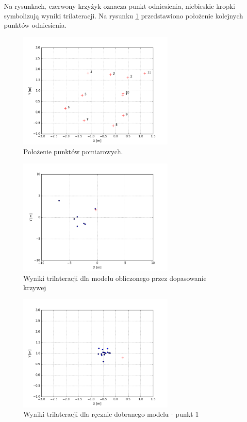 Na rysunkach, czerwony krzyżyk oznacza punkt odniesienia, niebieskie kropki symbolizują wyniki trilateracji. Na rysunku \ref{fig:referencyjne} przedstawiono położenie kolejnych punktów odniesienia.
\begin{figure}[H]
\centering
\includegraphics[width=0.7\textwidth]{img/references.png}
\caption{Położenie punktów pomiarowych.}
\label{fig:referencyjne}
\end{figure}
\begin{figure}[H]
\centering
\includegraphics[width=0.7\textwidth]{img/trilat-przegryw.png}
\caption{Wyniki trilateracji dla modelu obliczonego przez dopasowanie krzywej}
\label{fig:trilat-przegryw}
\end{figure}
\begin{figure}[H]
\centering
\includegraphics[width=0.7\textwidth]{img/trilat-map3-1.png}
\caption{Wyniki trilateracji dla ręcznie dobranego modelu - punkt 1}
\label{fig:trilat-first}
\end{figure}
